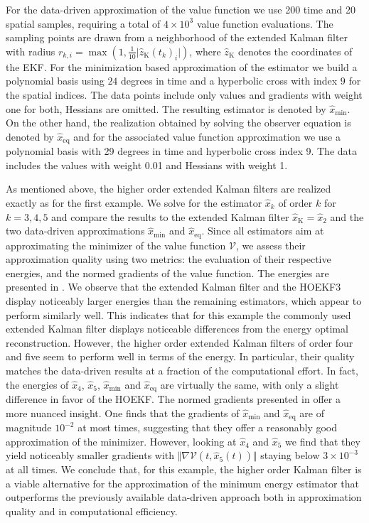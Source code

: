 \documentclass[11pt,reqno]{amsart}
\numberwithin{equation}{section}
\theoremstyle{plain}
\begin{document}
For the data-driven approximation of the value function we use 200 time and 20 spatial samples, requiring a total of $4 \times 10^3$ value function evaluations. The sampling points are drawn from a neighborhood of the extended Kalman filter with radius $r_{k,i} = \max \left( 1, \tfrac{1}{10} \vert \widehat{z}_\mathrm{K} (t_k)_i \vert \right)$,  where $\widehat{z}_\mathrm{K}$ denotes the coordinates of the EKF. 
For the minimization based approximation of the estimator we build a polynomial basis using $24$ degrees in time and a hyperbolic cross with index $9$ for the spatial indices. The data points include only values and gradients with weight one for both, Hessians are omitted. The resulting estimator is denoted by $\widehat{x}_\mathrm{min}$.
On the other hand, the realization obtained by solving the observer equation is denoted by $\widehat{x}_\mathrm{eq}$ and for the associated value function approximation we use a polynomial basis with 29 degrees in time and hyperbolic cross index 9. The data includes the values with weight 0.01 and Hessians with weight 1. 

As mentioned above, the higher order extended Kalman filters are realized exactly as for the first example. We solve for the estimator $\widehat{x}_k$ of order $k$ for $k = 3, 4, 5$ and compare the results to the extended Kalman filter $\widehat{x}_\mathrm{K} = \widehat{x}_2$ and the two data-driven approximations $\widehat{x}_\mathrm{min}$ and $\widehat{x}_\mathrm{eq}$. 
%
Since all estimators aim at approximating the minimizer of the value function $\mathcal{V}$, we assess their approximation quality using two metrics: the evaluation of their respective energies, and the normed gradients of the value function. The energies are presented in . We observe that the extended Kalman filter and the HOEKF3 display noticeably larger energies than the remaining estimators, which appear to perform similarly well. This indicates that for this example the commonly used extended Kalman filter displays noticeable differences from the energy optimal reconstruction. However, the higher order extended Kalman filters of order four and five seem to perform well in terms of the energy. In particular, their quality matches the data-driven results at a fraction of the computational effort. In fact, the energies of $\widehat{x}_4$, $\widehat{x}_5$, $\widehat{x}_\mathrm{min}$ and $\widehat{x}_\mathrm{eq}$ are virtually the same, with only a slight difference in favor of the HOEKF.
%
The normed gradients presented in  offer a more nuanced insight. One finds that the gradients of $\widehat{x}_\mathrm{min}$ and $\widehat{x}_\mathrm{eq}$ are of magnitude $10^{-2}$ at most times, suggesting that they offer a reasonably good approximation of the minimizer. However, looking at $\widehat{x}_4$ and $\widehat{x}_5$ we find that they yield noticeably smaller gradients with $\Vert \nabla \mathcal{V}(t,\widehat{x}_5(t)) \Vert$ staying below $3 \times 10^{-3}$ at all times. 
We conclude that, for this example, the higher order Kalman filter is a viable alternative for the approximation of the minimum energy estimator that outperforms the previously available data-driven approach both in approximation quality and in computational efficiency. 
\end{document}
